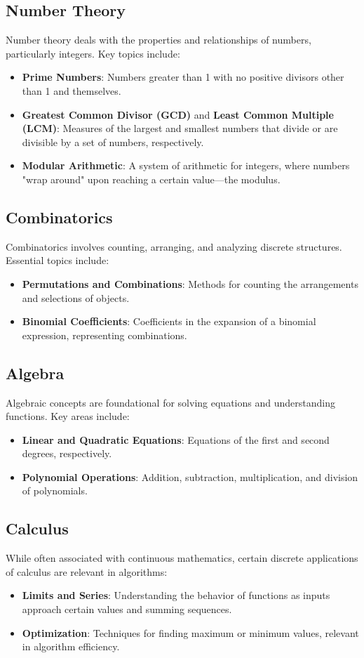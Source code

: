 \subsection{Number Theory}
Number theory deals with the properties and relationships of numbers, particularly integers. Key topics include:
\begin{itemize}
    \item \textbf{Prime Numbers}: Numbers greater than 1 with no positive divisors other than 1 and themselves.
    \item \textbf{Greatest Common Divisor (GCD)} and \textbf{Least Common Multiple (LCM)}: Measures of the largest and smallest numbers that divide or are divisible by a set of numbers, respectively.
    \item \textbf{Modular Arithmetic}: A system of arithmetic for integers, where numbers "wrap around" upon reaching a certain value—the modulus.
\end{itemize}

\subsection{Combinatorics}
Combinatorics involves counting, arranging, and analyzing discrete structures. Essential topics include:
\begin{itemize}
    \item \textbf{Permutations and Combinations}: Methods for counting the arrangements and selections of objects.
    \item \textbf{Binomial Coefficients}: Coefficients in the expansion of a binomial expression, representing combinations.
\end{itemize}

\subsection{Algebra}
Algebraic concepts are foundational for solving equations and understanding functions. Key areas include:
\begin{itemize}
    \item \textbf{Linear and Quadratic Equations}: Equations of the first and second degrees, respectively.
    \item \textbf{Polynomial Operations}: Addition, subtraction, multiplication, and division of polynomials.
\end{itemize}

\subsection{Calculus}
While often associated with continuous mathematics, certain discrete applications of calculus are relevant in algorithms:
\begin{itemize}
    \item \textbf{Limits and Series}: Understanding the behavior of functions as inputs approach certain values and summing sequences.
    \item \textbf{Optimization}: Techniques for finding maximum or minimum values, relevant in algorithm efficiency.
\end{itemize}

